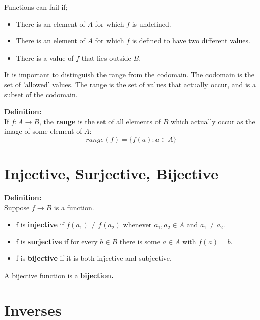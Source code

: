 \documentclass{report}
\newenvironment{frameblue}[1][BlueViolet]
  {\begin{tcolorbox}[colframe=#1,colback=white]}
  {\end{tcolorbox}}
\begin{document}
Functions can fail if;
\begin{itemize}
    \item There is an element of $A$ for which $f$ is undefined.
    \item There is an element of $A$ for which $f$ is defined to have two different values.
    \item There is a value of $f$ that lies outside $B$.
\end{itemize}

It is important to distinguish the range from the codomain. The codomain is the set of 'allowed' values. The range is the set of values that actually occur, and is a subset of the codomain.

\begin{frameblue}
    \textbf{Definition:}\\
    If $f: A \rightarrow B$, the \textbf{range} is the set of all elements of $B$ which actually occur as the image of some element of $A$:\\
    \begin{equation}
        range(f) = \{f(a) : a \in A \}
    \end{equation}
\end{frameblue}

\section{Injective, Surjective, Bijective}

\begin{frameblue}
    \textbf{Definition:}\\
    Suppose $f \rightarrow B$ is a function.
    \begin{itemize}
        \item f is \textbf{injective} if $f(a_1) \neq f(a_2)$ whenever $a_1, a_2 \in A$ and $a_1 \neq a_2$.
        \item f is \textbf{surjective} if for every $b \in B$ there is some $a \in A$ with $f(a) = b$.
        \item f is \textbf{bijective} if it is both injective and subjective.
    \end{itemize}
    A bijective function is a \textbf{bijection.}
\end{frameblue}

\section{Inverses}
\end{document}

